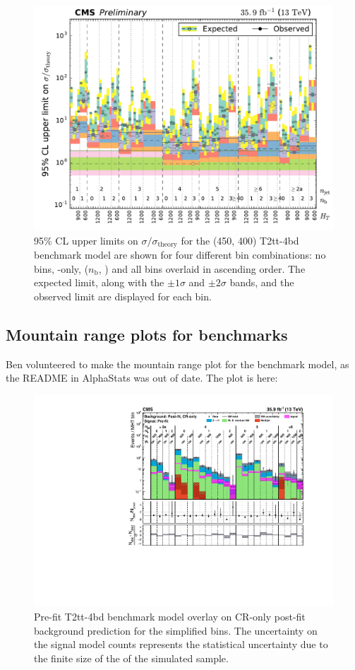 \begin{figure}[htbp]
\centering
\includegraphics[width=120mm]{./sec31/SMS-T2tt_mStop-450_mLSP-400_25ns_limits_nj_nb_ht.pdf}
\caption{95\% CL upper limits on $\sigma / \sigma_{\mathrm{theory}}$ for the (450, 400) T2tt-4bd benchmark model are shown for four different bin combinations: no bins, \HT-only, ($n_{\mathrm{b}}$, \HT) and all bins overlaid in ascending order. The expected limit, along with the $\pm 1 \sigma$ and $\pm 2 \sigma$ bands, and the observed limit are displayed for each bin.}
\end{figure}


\subsection{Mountain range plots for benchmarks}

Ben volunteered to make the mountain range plot for the benchmark model, as the README in AlphaStats was out of date. The plot is here:

\begin{figure}[htbp]
\centering
\includegraphics[width=140mm]{./sec31/all_full-fit-sig-top_bins_25.pdf}
\caption{Pre-fit T2tt-4bd benchmark model overlay on CR-only post-fit background prediction for the simplified bins. The uncertainty on the signal model counts represents the statistical uncertainty due to the finite size of the of the simulated sample.}
\end{figure}


